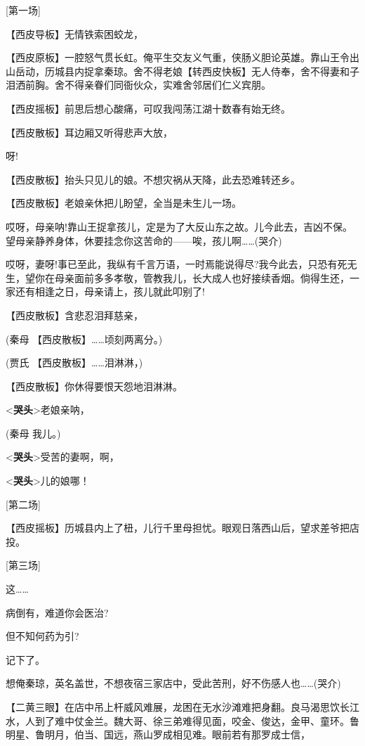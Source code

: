 {[}第一场{]}

【西皮导板】无情铁索困蛟龙，

【西皮原板】一腔怒气贯长虹。俺平生交友义气重，侠肠义胆论英雄。靠山王令出山岳动，历城县内捉拿秦琼。舍不得老娘【转西皮快板】无人侍奉，舍不得妻和子泪洒前胸。舍不得亲眷们同衙伙众，实难舍邻居们仁义宾朋。

【西皮摇板】前思后想心酸痛，可叹我闯荡江湖十数春有始无终。

【西皮散板】耳边厢又听得悲声大放，

呀!

【西皮散板】抬头只见儿的娘。不想灾祸从天降，此去恐难转还乡。

【西皮散板】老娘亲休把儿盼望，全当是未生儿一场。

哎呀，母亲呐!靠山王捉拿孩儿，定是为了大反山东之故。儿今此去，吉凶不保。望母亲静养身体，休要挂念你这苦命的------唉，孩儿啊\ldots{}\ldots{}(哭介)

哎呀，妻呀!事已至此，我纵有千言万语，一时焉能说得尽?我今此去，只恐有死无生，望你在母亲面前多多孝敬，管教我儿，长大成人也好接续香烟。倘得生还，一家还有相逢之日，母亲请上，孩儿就此叩别了!

【西皮散板】含悲忍泪拜慈亲，

(秦母 【西皮散板】\ldots{}\ldots{}顷刻两离分。)

(贾氏 【西皮散板】\ldots{}\ldots{}泪淋淋，)

【西皮散板】你休得要恨天怨地泪淋淋。

\textless{}\textbf{哭头}\textgreater{}老娘亲呐，

(秦母 我儿。)

\textless{}\textbf{哭头}\textgreater{}受苦的妻啊，啊，

\textless{}\textbf{哭头}\textgreater{}儿的娘哪！

{[}第二场{]}

【西皮摇板】历城县内上了杻，儿行千里母担忧。眼观日落西山后，望求差爷把店投。

{[}第三场{]}

这\ldots{}\ldots{}

病倒有，难道你会医治?

但不知何药为引?

记下了。

想俺秦琼，英名盖世，不想夜宿三家店中，受此苦刑，好不伤感人也\ldots{}\ldots{}(哭介)

【二黄三眼】在店中吊上杆威风难展，龙困在无水沙滩难把身翻。良马渴思饮长江水，人到了难中仗金兰。魏大哥、徐三弟难得见面，咬金、俊达，金甲、童环。鲁明星、鲁明月，伯当、国远，燕山罗成相见难。眼前若有那罗成士信，


